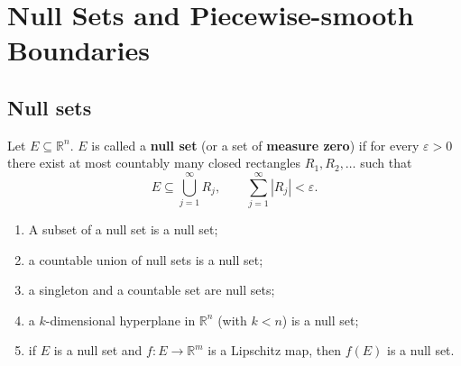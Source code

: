 \section{Null Sets and Piecewise-smooth Boundaries}

\subsection{Null sets}

\begin{definition}\label{def:null_set}
Let $E \subseteq \mathbb{R}^n$. $E$ is called a \textbf{null set} (or a set of \textbf{measure zero}) if for every $\varepsilon > 0$ there exist at most countably many closed rectangles $R_1, R_2, \dots$ such that
\[
E \subseteq \bigcup_{j=1}^{\infty} R_j, \qquad \sum_{j=1}^{\infty} |R_j| < \varepsilon.
\]
\end{definition}

\begin{proposition}\label{prop:null_set_properties}
\begin{enumerate}[label=(\roman*)]
    \item A subset of a null set is a null set;
    \item a countable union of null sets is a null set;
    \item a singleton and a countable set are null sets;
    \item a $k$-dimensional hyperplane in $\mathbb{R}^n$ (with $k < n$) is a null set;
    \item if $E$ is a null set and $f: E \to \mathbb{R}^m$ is a Lipschitz map, then $f(E)$ is a null set.
\end{enumerate}
\end{proposition}

